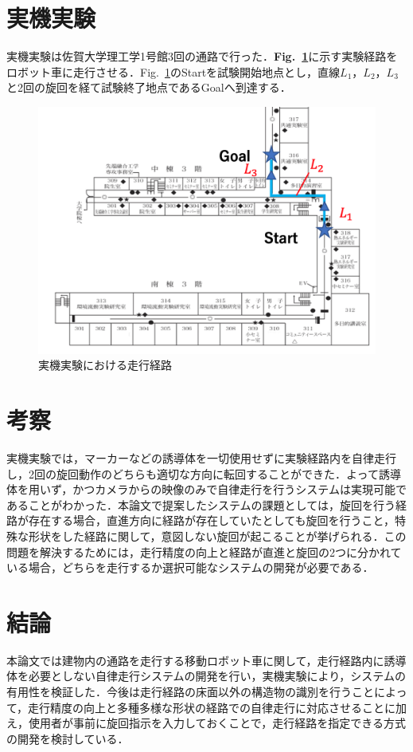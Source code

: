 \documentclass[luatex,fleqn,twocolumn,twoside]{ltjarticle}
\begin{document}
\section{\large 実機実験}
実機実験は佐賀大学理工学1号館3回の通路で行った．{\bf Fig.~\ref{fig:ex_path2}}に示す実験経路をロボット車に走行させる．{Fig.~\ref{fig:ex_path2}}のStartを試験開始地点とし，直線$L_1$，$L_2$，$L_3$と2回の旋回を経て試験終了地点であるGoalへ到達する．
\begin{figure}[tb]
	\begin{center}
	\includegraphics[scale=0.4]{./fig/ex_path2.png}
	\caption{実機実験における走行経路}
	\label{fig:ex_path2}
	\end{center}
\end{figure}
\section{\large 考察}

実機実験では，マーカーなどの誘導体を一切使用せずに実験経路内を自律走行し，2回の旋回動作のどちらも適切な方向に転回することができた．よって誘導体を用いず，かつカメラからの映像のみで自律走行を行うシステムは実現可能であることがわかった．本論文で提案したシステムの課題としては，旋回を行う経路が存在する場合，直進方向に経路が存在していたとしても旋回を行うこと，特殊な形状をした経路に関して，意図しない旋回が起こることが挙げられる．この問題を解決するためには，走行精度の向上と経路が直進と旋回の2つに分かれている場合，どちらを走行するか選択可能なシステムの開発が必要である．

\section{\large 結論}

本論文では建物内の通路を走行する移動ロボット車に関して，走行経路内に誘導体を必要としない自律走行システムの開発を行い，実機実験により，システムの有用性を検証した．今後は走行経路の床面以外の構造物の識別を行うことによって，走行精度の向上と多種多様な形状の経路での自律走行に対応させることに加え，使用者が事前に旋回指示を入力しておくことで，走行経路を指定できる方式の開発を検討している．
\end{document}
